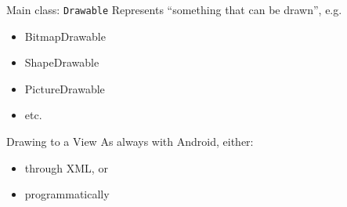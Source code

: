 \documentclass[aspectratio=169]{beamer}
\begin{document}
\begin{frame}[fragile]{Main class: {\tt Drawable}}
\Large
Represents ``something that can be drawn'', e.g.
\begin{itemize}
\item BitmapDrawable
\item ShapeDrawable
\item PictureDrawable
\item etc.
\end{itemize}
\end{frame}



\begin{frame}[fragile]{Drawing to a View}
\Large
As always with Android, either:
\begin{itemize}
\item through XML, or
\item programmatically
\end{itemize}
\end{frame}
\end{document}
